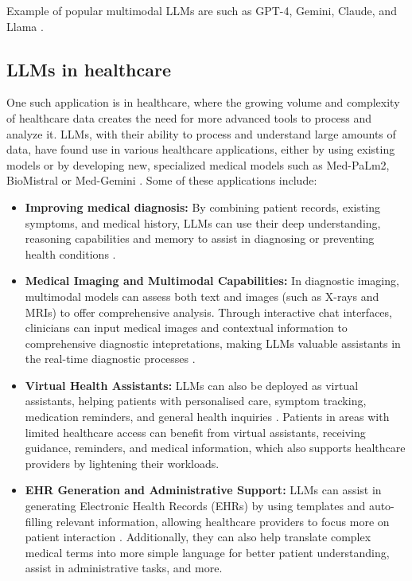 Example of popular multimodal LLMs are such as GPT-4, Gemini, Claude, and Llama \parencite{gpt4,gemini,llama3,claude}.


\subsection{LLMs in healthcare}

One such application is in healthcare, where the growing volume and complexity of healthcare data creates the need for more advanced tools to process and analyze it. LLMs, with their ability to process and understand large amounts of data, have found use in various healthcare applications, either by using existing models or by developing new, specialized medical models such as Med-PaLm2, BioMistral or Med-Gemini \parencite{biomistral,medgemini,medpalm2}. Some of these applications include:

\begin{itemize}
    \item \textbf{Improving medical diagnosis:} By combining patient records, existing symptoms, and medical history, LLMs can use their deep understanding, reasoning capabilities and memory to assist in diagnosing or preventing health conditions \parencite{llm_healthcare,llm_healthcare3,llm_healthcare4}.
    \item \textbf{Medical Imaging and Multimodal Capabilities:} In diagnostic imaging, multimodal models can assess both text and images (such as X-rays and MRIs) to offer comprehensive analysis. Through interactive chat interfaces, clinicians can input medical images and contextual information to comprehensive diagnostic intepretations, making LLMs valuable assistants in the real-time diagnostic processes \parencite{llm_healthcare3}.
    \item \textbf{Virtual Health Assistants:} LLMs can also be deployed as virtual assistants, helping patients with personalised care, symptom tracking, medication reminders, and general health inquiries \parencite{llm_healthcare,llm_healthcare3}. Patients in areas with limited healthcare access can benefit from virtual assistants, receiving guidance, reminders, and medical information, which also supports healthcare providers by lightening their workloads.
    \item \textbf{EHR Generation and Administrative Support:} LLMs can assist in generating Electronic Health Records (EHRs) by using templates and auto-filling relevant information, allowing healthcare providers to focus more on patient interaction \parencite{llm_healthcare4}. Additionally, they can also help translate complex medical terms into more simple language for better patient understanding, assist in administrative tasks, and more.
\end{itemize}

